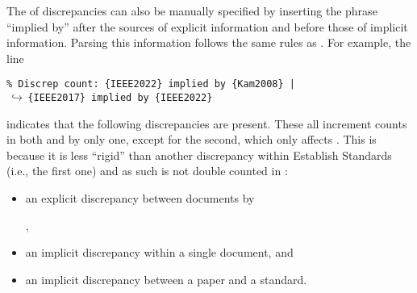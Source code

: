 The  of discrepancies can also be manually specified by
inserting the phrase ``implied by'' after the sources of explicit information
and before those of implicit information. Parsing this information follows the
same rules as . For example, the line

\begin{displayquote}
    \texttt{\% Discrep count: \{IEEE2022\} implied by \{Kam2008\} |\\
        $\,\hookrightarrow\,$\quad \{IEEE2017\} implied by \{IEEE2022\}}
\end{displayquote}

indicates that the following discrepancies are present. These all increment
counts in both  and  by only one,
except for the second, which only affects . This is
because it is less ``rigid'' than another discrepancy within Establish Standards%
 (i.e., the first one) and as such is
not double counted in :

\begin{itemize}
    \item an explicit discrepancy between documents by
          \begin{NoHyper}\citeauthor{IEEE2022}\end{NoHyper},
    \item an implicit discrepancy within a single document, and
    \item an implicit discrepancy between a paper and a standard.
\end{itemize}
